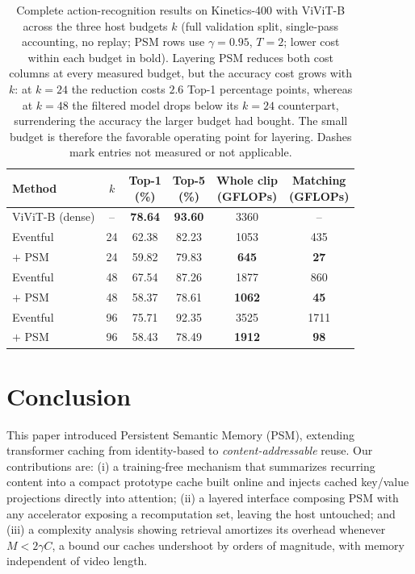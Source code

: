 \documentclass[letterpaper]{article}
\begin{document}
\begin{table}[t]
\centering
\footnotesize
\setlength{\tabcolsep}{4pt}
\begin{tabular}{lccccc}
\toprule
Method & $k$ & \makecell{Top-1\\(\%)} & \makecell{Top-5\\(\%)} &
\makecell{Whole clip\\(GFLOPs)} & \makecell{Matching\\(GFLOPs)} \\
\midrule
ViViT-B (dense)    & --  & \textbf{78.64} & \textbf{93.60} & 3360 & -- \\
\midrule
Eventful           & 24  & 62.38 & 82.23 & 1053 & 435 \\
\;\;$+$ PSM   & 24  & 59.82 & 79.83 & \textbf{645} & \textbf{27} \\
\midrule
Eventful           & 48  & 67.54 & 87.26 & 1877 & 860 \\
\;\;$+$ PSM   & 48  & 58.37 & 78.61 & \textbf{1062} & \textbf{45} \\
\midrule
Eventful           & 96  & 75.71 & 92.35 & 3525 & 1711 \\
\;\;$+$ PSM        & 96  & 58.43 & 78.49 & \textbf{1912} & \textbf{98}   \\
\bottomrule
\end{tabular}
\caption{Complete action-recognition results on Kinetics-400 with
ViViT-B across the three host budgets $k$ (full validation split,
single-pass accounting, no replay; PSM rows use $\gamma = 0.95$,
$T = 2$; lower cost within each budget in bold). Layering PSM reduces
both cost columns at every measured budget, but the accuracy cost
grows with $k$: at $k = 24$ the reduction costs $2.6$ Top-1 percentage points,
whereas at $k = 48$ the filtered model drops below its $k = 24$
counterpart, surrendering the accuracy the larger budget had bought.
The small budget is therefore the favorable operating point for
layering. Dashes mark entries not measured or not applicable.}
\label{tab:k400}
\end{table}

\section{Conclusion}
\label{sec:conclusion}

This paper introduced Persistent Semantic Memory (PSM), extending
transformer caching from identity-based to \emph{content-addressable}
reuse. Our contributions are: (i) a training-free mechanism that
summarizes recurring content into a compact prototype cache built
online and injects cached key/value projections directly into
attention; (ii) a layered interface composing PSM with any accelerator
exposing a recomputation set, leaving the host untouched; and (iii) a
complexity analysis showing retrieval amortizes its overhead whenever
$M < 2\gamma C$, a bound our caches undershoot by orders of magnitude, with
memory independent of video length.
\end{document}
